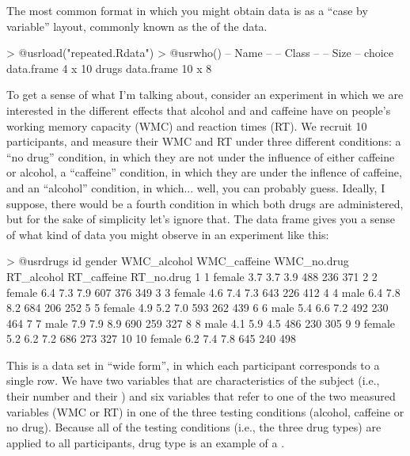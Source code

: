 

The most common format in which you might obtain data is as a ``case by variable'' layout, commonly known as the  of the data. 

\begin{rblock1}
> @usr{load("repeated.Rdata")}
> @usr{who()}
   -- Name --   -- Class --   -- Size --
   choice       data.frame    4 x 10    
   drugs        data.frame    10 x 8    
\end{rblock1}

To get a sense of what I'm talking about, consider an experiment in which we are interested in the different effects that alcohol and and caffeine have on people's working memory capacity (WMC) and reaction times (RT). We recruit 10 participants, and measure their WMC and RT under three different conditions: a ``no drug'' condition, in which they are not under the influence of either caffeine or alcohol, a ``caffeine'' condition, in which they are under the inflence of caffeine, and an ``alcohol'' condition, in which... well, you can probably guess. Ideally, I suppose, there would be a fourth condition in which both drugs are administered, but for the sake of simplicity let's ignore that. The  data frame gives you a sense of what kind of data you might observe in an experiment like this:
\begin{rblock1}
> @usr{drugs}
   id gender WMC_alcohol WMC_caffeine WMC_no.drug RT_alcohol RT_caffeine RT_no.drug
1   1 female         3.7          3.7         3.9        488         236        371
2   2 female         6.4          7.3         7.9        607         376        349
3   3 female         4.6          7.4         7.3        643         226        412
4   4   male         6.4          7.8         8.2        684         206        252
5   5 female         4.9          5.2         7.0        593         262        439
6   6   male         5.4          6.6         7.2        492         230        464
7   7   male         7.9          7.9         8.9        690         259        327
8   8   male         4.1          5.9         4.5        486         230        305
9   9 female         5.2          6.2         7.2        686         273        327
10 10 female         6.2          7.4         7.8        645         240        498
\end{rblock1}
This is a data set in ``wide form'', in which each participant corresponds to a single row. We have two variables that are characteristics of the subject (i.e., their  number and their ) and six variables that refer to one of the two measured variables (WMC or RT) in one of the three testing conditions (alcohol, caffeine or no drug). Because all of the testing conditions (i.e., the three drug types) are applied to all participants, drug type is an example of a . 


